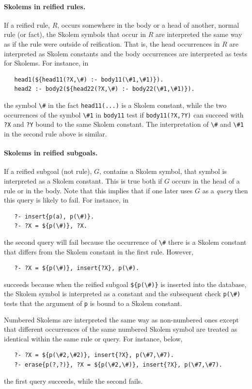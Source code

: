 \documentclass[11pt]{article}
\begin{document}
\paragraph{Skolems in reified rules.}
If a reified rule, $R$,
occurs somewhere in the body or a head of another, normal rule (or fact),
the Skolem symbols that occur in $R$ are interpreted the same way as if the
rule were outside of reification. That is, the head occurrences in $R$ are
interpreted as Skolem constants and the body occurrences are interpreted as
tests for Skolems. For instance, in
\begin{verbatim}
   head1(${head11(?X,\#) :- body11(\#1,\#1)}).
   head2 :- body2(${head22(?X,\#) :- body22(\#1,\#1)}).
\end{verbatim}
the symbol \verb|\#| in the fact \texttt{head11(...)} is a Skolem constant, while the
two occurrences of the symbol \verb|\#1| in \texttt{body11} test if
\texttt{body11(?X,?Y)} can succeed with \texttt{?X} and \texttt{?Y} bound
to the same Skolem constant. The interpretation of \verb|\#| and \verb|\#1|
in the second rule above is similar.    

\paragraph{Skolems in reified subgoals.}
If a reified subgoal (not rule), $G$, contains a Skolem symbol, that symbol is
interpreted as a Skolem constant. This is true both if $G$ occurs in the head
of a rule or in the body.
Note that this implies that if one later uses $G$ as a \emph{query} then
this query is likely to fail. For instance, in
\begin{verbatim}
   ?- insert{p(a), p(\#)}.
   ?- ?X = ${p(\#)}, ?X.
\end{verbatim}
the second query will fail because the occurrence of \verb|\#| there is a
Skolem constant that differs from the Skolem constant in the first rule.
However,
\begin{verbatim}
   ?- ?X = ${p(\#)}, insert{?X}, p(\#).
\end{verbatim}
succeeds because when the reified subgoal \verb|${p(\#)}| is inserted into the
database, the Skolem symbol is interpreted as a constant and the subsequent
check \verb|p(\#)| tests that the argument of \texttt{p} is bound to a
Skolem constant. 

Numbered Skolems are interpreted the same way as non-numbered ones except
that different occurrences of the same numbered Skolem symbol are treated
as identical within the same rule or query.
For instance, below,
\begin{verbatim}
   ?- ?X = ${p(\#2,\#2)}, insert{?X}, p(\#7,\#7).
   ?- erase{p(?,?)}, ?X = ${p(\#2,\#)}, insert{?X}, p(\#7,\#7).
\end{verbatim}
the first query succeeds, while the second fails.
\end{document}
